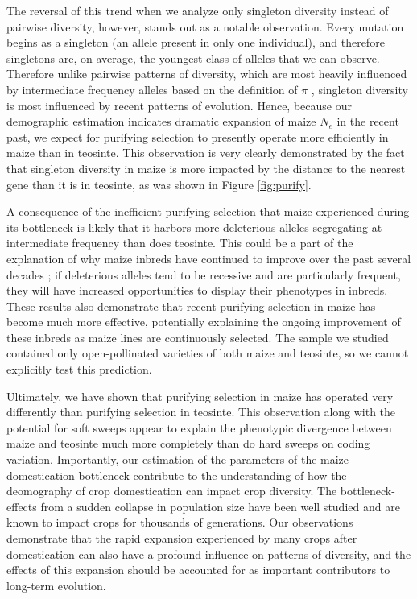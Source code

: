 \documentclass{pnastwo}
\begin{document}
\begin{article}
The reversal of this trend when we analyze only singleton diversity instead of pairwise diversity, however, stands out as a notable observation. Every mutation begins as a singleton (an allele present in only one individual), and therefore singletons are, on average, the youngest class of alleles that we can observe. Therefore unlike pairwise patterns of diversity, which are most heavily influenced by intermediate frequency alleles based on the definition of $\pi$ \cite{nei1979}, singleton diversity is most influenced by recent patterns of evolution. Hence, because our demographic estimation indicates dramatic expansion of maize $N_e$ in the recent past, we expect for purifying selection to presently operate more efficiently in maize than in teosinte. This observation is very clearly demonstrated by the fact that singleton diversity in maize is more impacted by the distance to the nearest gene than it is in teosinte, as was shown in Figure \ref{fig:purify}.

A consequence of the inefficient purifying selection that maize experienced during its bottleneck is likely that it harbors more deleterious alleles segregating at intermediate frequency than does teosinte. This could be a part of the explanation of why maize inbreds have continued to improve over the past several decades \cite{something}; if deleterious alleles tend to be recessive and are particularly frequent, they will have increased opportunities to display their phenotypes in inbreds. These results also demonstrate that recent purifying selection in maize has become much more effective, potentially explaining the ongoing improvement of these inbreds as maize lines are continuously selected. The sample we studied contained only open-pollinated varieties of both maize and teosinte, so we cannot explicitly test this prediction.

Ultimately, we have shown that purifying selection in maize has operated very differently than purifying selection in teosinte. This observation along with the potential for soft sweeps appear to explain the phenotypic divergence between maize and teosinte much more completely than do hard sweeps on coding variation. Importantly, our estimation of the parameters of the maize domestication bottleneck contribute to the understanding of how the deomography of crop domestication can impact crop diversity. The bottleneck-effects from a sudden collapse in population size have been well studied and are known to impact crops for thousands of generations. Our observations demonstrate that the rapid expansion experienced by many crops after domestication can also have a profound influence on patterns of diversity, and the effects of this expansion should be accounted for as important contributors to long-term evolution.


\end{article}
\end{document}
